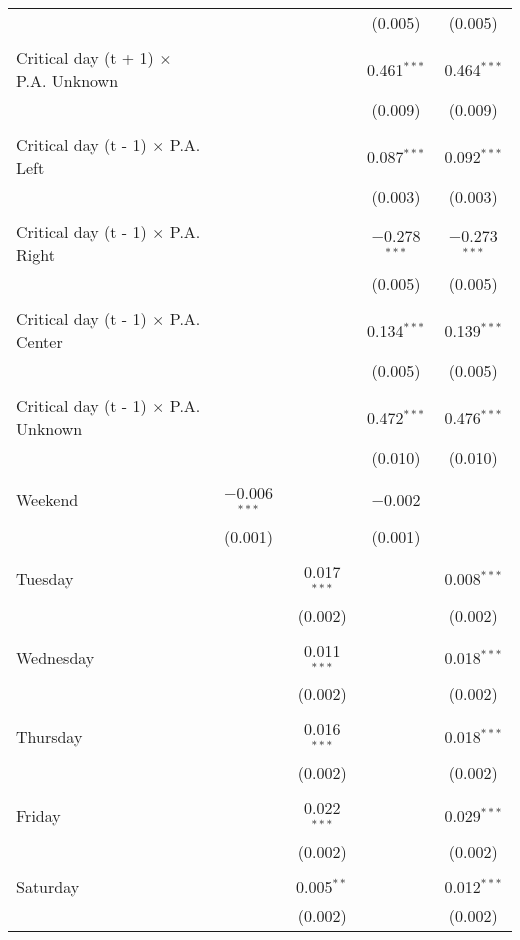 \documentclass[
]{article}
\begin{document}
\begin{table}[!htbp]
{\begin{tabular}{@{\extracolsep{5pt}}lcccc}
  &  &  & (0.005) & (0.005) \\ 
  & & & & \\ 
 Critical day (t + 1) $\times$ P.A. Unknown &  &  & 0.461$^{***}$ & 0.464$^{***}$ \\ 
  &  &  & (0.009) & (0.009) \\ 
  & & & & \\ 
 Critical day (t - 1) $\times$ P.A. Left &  &  & 0.087$^{***}$ & 0.092$^{***}$ \\ 
  &  &  & (0.003) & (0.003) \\ 
  & & & & \\ 
 Critical day (t - 1) $\times$ P.A. Right &  &  & $-$0.278$^{***}$ & $-$0.273$^{***}$ \\ 
  &  &  & (0.005) & (0.005) \\ 
  & & & & \\ 
 Critical day (t - 1) $\times$ P.A. Center &  &  & 0.134$^{***}$ & 0.139$^{***}$ \\ 
  &  &  & (0.005) & (0.005) \\ 
  & & & & \\ 
 Critical day (t - 1) $\times$ P.A. Unknown &  &  & 0.472$^{***}$ & 0.476$^{***}$ \\ 
  &  &  & (0.010) & (0.010) \\ 
  & & & & \\ 
 Weekend & $-$0.006$^{***}$ &  & $-$0.002 &  \\ 
  & (0.001) &  & (0.001) &  \\ 
  & & & & \\ 
 Tuesday &  & 0.017$^{***}$ &  & 0.008$^{***}$ \\ 
  &  & (0.002) &  & (0.002) \\ 
  & & & & \\ 
 Wednesday &  & 0.011$^{***}$ &  & 0.018$^{***}$ \\ 
  &  & (0.002) &  & (0.002) \\ 
  & & & & \\ 
 Thursday &  & 0.016$^{***}$ &  & 0.018$^{***}$ \\ 
  &  & (0.002) &  & (0.002) \\ 
  & & & & \\ 
 Friday &  & 0.022$^{***}$ &  & 0.029$^{***}$ \\ 
  &  & (0.002) &  & (0.002) \\ 
  & & & & \\ 
 Saturday &  & 0.005$^{**}$ &  & 0.012$^{***}$ \\ 
  &  & (0.002) &  & (0.002) \\ 

\end{tabular}}
\end{table}
\end{document}
